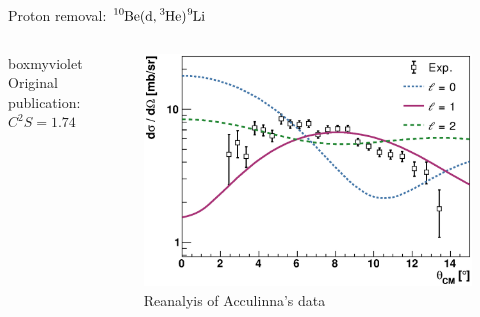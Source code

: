 \documentclass[sans,
frameno, %
mp,
usenames,dvipsnames, %
onlytextwidth, %
t,%
11pt]{beamer}
\newcommand{\iso}[2]{\ce{^{#1}#2}}
\begin{document}
\begin{frame}{Proton removal: $\iso{10}{Be}(\textrm{d}, \iso{3}{He})\iso{9}{Li}$}
{\begin{columns}[t]
{{                    \medskip
                    \hfill
                    \begin{beamercolorbox}[sep=1ex,center, rounded=true, wd=0.95\linewidth]{boxmyviolet}
                        Original publication:\\
                        $C^2S = \qty{1.74}{}$
                    \end{beamercolorbox}
                    \hfill
                }
                {
                    \begin{figure}
                        \centering
                        \captionsetup{belowskip=-8pt}
                        \caption{Reanalyis of Acculinna's data}
                        \includegraphics[width=\linewidth, cfbox=Mulberry 1pt 0pt 0pt]{figures/acculina.eps}%
                    \end{figure}

}}
\end{columns}}
\end{frame}
\end{document}
